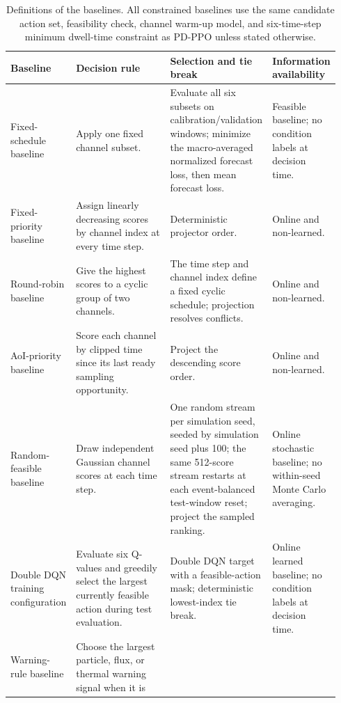 \begin{table}[H]
  \centering
  \caption{Definitions of the baselines. All constrained baselines use the same
  candidate action set, feasibility check, channel warm-up model, and six-time-step
  minimum dwell-time constraint as PD-PPO unless
  stated otherwise.}
  \label{tab:executable_baseline_definitions}
  \scriptsize
  \renewcommand{\arraystretch}{0.92}
  \setlength{\tabcolsep}{2.6pt}
  \begin{tabular}{@{}p{0.19\linewidth}p{0.31\linewidth}p{0.25\linewidth}p{0.19\linewidth}@{}}
    \toprule
    Baseline & Decision rule & Selection and tie break & Information availability \\
    \midrule
    Fixed-schedule baseline
      & Apply one fixed channel subset.
      & Evaluate all six subsets on calibration/validation windows; minimize the
        macro-averaged normalized forecast loss, then mean forecast loss.
      & Feasible baseline; no condition labels at decision time. \\
    Fixed-priority baseline
      & Assign linearly decreasing scores by channel index at every time step.
      & Deterministic projector order.
      & Online and non-learned. \\
    Round-robin baseline
      & Give the highest scores to a cyclic group of two channels.
      & The time step and channel index define a fixed cyclic schedule; projection resolves conflicts.
      & Online and non-learned. \\
    AoI-priority baseline
      & Score each channel by clipped time since its last ready sampling opportunity.
      & Project the descending score order.
      & Online and non-learned. \\
    Random-feasible baseline
      & Draw independent Gaussian channel scores at each time step.
      & One random stream per simulation seed, seeded by simulation seed plus 100; the same 512-score stream restarts at each event-balanced test-window reset; project the sampled ranking.
      & Online stochastic baseline; no within-seed Monte Carlo averaging. \\
    Double DQN training configuration
      & Evaluate six Q-values and greedily select the largest currently feasible
        action during test evaluation.
      & Double DQN target with a feasible-action mask; deterministic
        lowest-index tie break.
      & Online learned baseline; no condition labels at decision time. \\
    Warning-rule baseline
      & Choose the largest particle, flux, or thermal warning signal when it is

\end{tabular}
\end{table}
